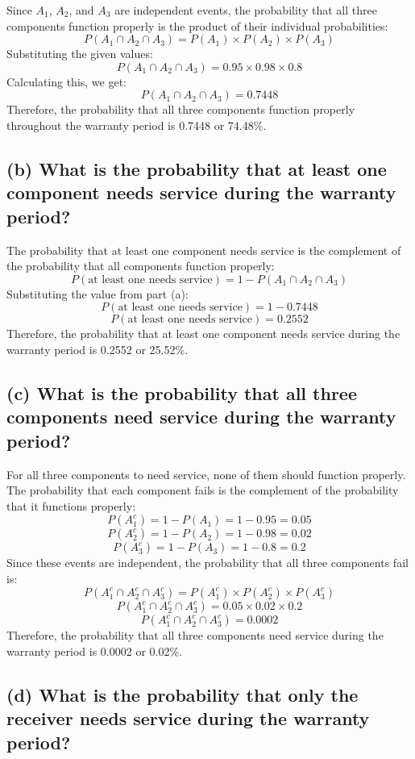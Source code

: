 \documentclass{article}
\begin{document}
Since \(A_1\), \(A_2\), and \(A_3\) are independent events, the probability that all three components function properly is the product of their individual probabilities:
\[
P(A_1 \cap A_2 \cap A_3) = P(A_1) \times P(A_2) \times P(A_3)
\]
Substituting the given values:
\[
P(A_1 \cap A_2 \cap A_3) = 0.95 \times 0.98 \times 0.8
\]
Calculating this, we get:
\[
P(A_1 \cap A_2 \cap A_3) = 0.7448
\]
Therefore, the probability that all three components function properly throughout the warranty period is 0.7448 or 74.48\%.

\subsection*{(b) What is the probability that at least one component needs service during the warranty period?}

The probability that at least one component needs service is the complement of the probability that all components function properly:
\[
P(\text{at least one needs service}) = 1 - P(A_1 \cap A_2 \cap A_3)
\]
Substituting the value from part (a):
\[
P(\text{at least one needs service}) = 1 - 0.7448
\]
\[
P(\text{at least one needs service}) = 0.2552
\]
Therefore, the probability that at least one component needs service during the warranty period is 0.2552 or 25.52\%.

\subsection*{(c) What is the probability that all three components need service during the warranty period?}

For all three components to need service, none of them should function properly. The probability that each component fails is the complement of the probability that it functions properly:
\[
P(A_1^c) = 1 - P(A_1) = 1 - 0.95 = 0.05
\]
\[
P(A_2^c) = 1 - P(A_2) = 1 - 0.98 = 0.02
\]
\[
P(A_3^c) = 1 - P(A_3) = 1 - 0.8 = 0.2
\]
Since these events are independent, the probability that all three components fail is:
\[
P(A_1^c \cap A_2^c \cap A_3^c) = P(A_1^c) \times P(A_2^c) \times P(A_3^c)
\]
\[
P(A_1^c \cap A_2^c \cap A_3^c) = 0.05 \times 0.02 \times 0.2
\]
\[
P(A_1^c \cap A_2^c \cap A_3^c) = 0.0002
\]
Therefore, the probability that all three components need service during the warranty period is 0.0002 or 0.02\%.

\subsection*{(d) What is the probability that only the receiver needs service during the warranty period?}
\end{document}

